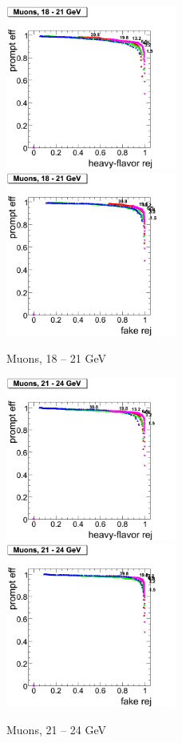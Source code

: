 \clearpage

\begin{figure}[htbp]
   \includegraphics[width = 0.5\textwidth]{pictures/bkgdRej_sigEff/muon_nonPrompt_ptCut5_ptCut6.png}
   \includegraphics[width = 0.5\textwidth]{pictures/bkgdRej_sigEff/muon_fake_ptCut5_ptCut6.png}
   \caption{Muons, 18 -- 21 GeV}
   \label{fig:muon_ptCut5_ptCut6}
\end{figure}

\begin{figure}[htbp]
   \includegraphics[width = 0.5\textwidth]{pictures/bkgdRej_sigEff/muon_nonPrompt_ptCut6_ptCut7.png}
   \includegraphics[width = 0.5\textwidth]{pictures/bkgdRej_sigEff/muon_fake_ptCut6_ptCut7.png}
   \caption{Muons, 21 -- 24 GeV}
   \label{fig:muon_ptCut6_ptCut7}
\end{figure}

